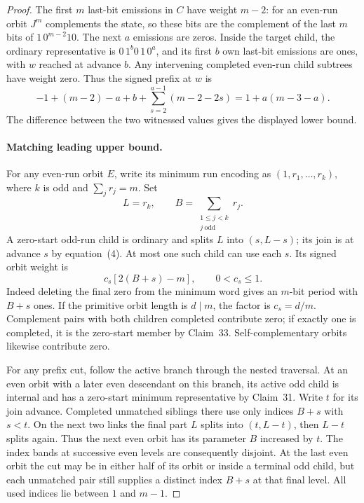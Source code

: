 \documentclass[11pt]{article}
\begin{document}
\begin{proof}
The first \(m\) last-bit emissions in \(C\) have weight \(m-2\): for an even-run orbit \(J^m\) complements the state, so these bits are the complement of the last \(m\) bits of \(1\,0^{m-2}10\). The next \(a\) emissions are zeros. Inside the target child, the ordinary representative is \(0\,1^b0\,1\,0^a\), and its first \(b\) own last-bit emissions are ones, with \(w\) reached at advance \(b\). Any intervening completed even-run child subtrees have weight zero. Thus the signed prefix at \(w\) is
\[
   -1+(m-2)-a+b+\sum_{s=2}^{a-1}(m-2-2s)
   =1+a(m-3-a).
\]
The difference between the two witnessed values gives the displayed lower bound.

\paragraph{Matching leading upper bound.}
For any even-run orbit \(E\), write its minimum run encoding as
\((1,r_1,\ldots,r_k)\), where \(k\) is odd and \(\sum_jr_j=m\). Set
\[
   L=r_k,\qquad B=\sum_{\substack{1\le j<k\\j\ \mathrm{odd}}}r_j.
\]
A zero-start odd-run child is ordinary and splits \(L\) into \((s,L-s)\); its join is at advance \(s\) by equation~(4). At most one such child can use each \(s\). Its signed orbit weight is
\[
   c_s[2(B+s)-m],\qquad 0<c_s\le1.
\]
Indeed deleting the final zero from the minimum word gives an \(m\)-bit period with \(B+s\) ones. If the primitive orbit length is \(d\mid m\), the factor is \(c_s=d/m\). Complement pairs with both children completed contribute zero; if exactly one is completed, it is the zero-start member by Claim~33. Self-complementary orbits likewise contribute zero.

For any prefix cut, follow the active branch through the nested traversal. At an even orbit with a later even descendant on this branch, its active odd child is internal and has a zero-start minimum representative by Claim~31. Write \(t\) for its join advance. Completed unmatched siblings there use only indices \(B+s\) with \(s<t\). On the next two links the final part \(L\) splits into \((t,L-t)\), then \(L-t\) splits again. Thus the next even orbit has its parameter \(B\) increased by \(t\). The index bands at successive even levels are consequently disjoint. At the last even orbit the cut may be in either half of its orbit or inside a terminal odd child, but each unmatched pair still supplies a distinct index \(B+s\) at that final level. All used indices lie between \(1\) and \(m-1\).


\end{proof}
\end{document}
